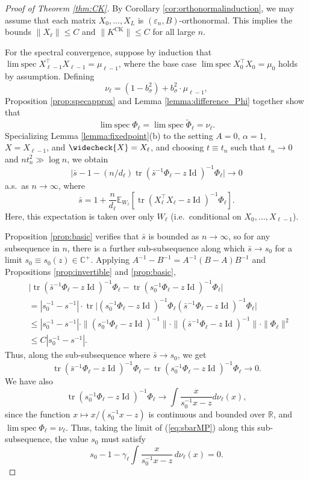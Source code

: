 \documentclass{article}
\theoremstyle{definition}
\newcommand{\R}{\mathbb{R}}
\newcommand{\C}{\mathbb{C}}
\newcommand{\E}{\mathbb{E}}
\newcommand{\Id}{\operatorname{Id}}
\newcommand{\CK}{\text{CK}}
\newcommand{\tr}{\operatorname{tr}}
\newcommand{\eps}{\varepsilon}
\newcommand{\vX}{\widecheck{X}}
\newcommand{\1}{\mathbf{1}}
\newcommand{\limspec}{\operatorname{lim\;spec}}
\begin{document}
\begin{proof}[Proof of Theorem \ref{thm:CK}]
By Corollary \ref{cor:orthonormalinduction},
we may assume that each matrix $X_0,\ldots,X_L$ is $(\eps_n,B)$-orthonormal.
This implies the bounds
$\|X_\ell\| \leq C$ and $\|K^\CK\| \leq C$ for all large $n$.

For the spectral convergence, suppose by induction that
$\limspec X_{\ell-1}^\top X_{\ell-1}=\mu_{\ell-1}$,
where the base case $\limspec X_0^\top X_0=\mu_0$ holds by assumption.
Defining
\[\nu_\ell=(1-b_\sigma^2)+b_\sigma^2 \cdot \mu_{\ell-1},\]
Proposition \ref{prop:specapprox} and Lemma \ref{lemma:difference_Phi}
together show that
\[\limspec \Phi_\ell=\limspec \tilde{\Phi}_\ell=\nu_\ell.\]
Specializing
Lemma \ref{lemma:fixedpoint}(b) to the setting $A=0$, $\alpha=1$,
$X=X_{\ell-1}$, and $\vX=X_\ell$,
and choosing $t \equiv t_n$ such that $t_n \to 0$ and
$nt_n^2 \gg \log n$, we obtain
\begin{equation}\label{eq:sbarMP}
\Big|\bar{s}-1-(n/d_\ell) \tr (\bar{s}^{-1}\Phi_\ell-z\Id)^{-1}\Phi_\ell\Big| \to 0
\end{equation}
a.s.\ as $n \to \infty$, where
\[\bar{s}=1+\frac{n}{d_\ell}
\E_{W_\ell}[\tr (X_\ell^\top X_\ell-z\Id)^{-1}\Phi_\ell].\]
Here, this expectation is taken over only $W_\ell$ (i.e.\ conditional on
$X_0,\ldots,X_{\ell-1}$).

Proposition \ref{prop:basic} verifies that $\bar{s}$
is bounded as $n \to \infty$,
so for any subsequence in $n$, there is a further
sub-subsequence along which $\bar{s} \to s_0$ for a limit $s_0 \equiv s_0(z)
\in \C^+$. Applying $A^{-1}-B^{-1}=A^{-1}(B-A)B^{-1}$ and Propositions
\ref{prop:invertible} and \ref{prop:basic},
\begin{align*}
&\Big|\tr (\bar{s}^{-1}\Phi_\ell-z\Id)^{-1}\Phi_\ell-
\tr (s_0^{-1}\Phi_\ell-z\Id)^{-1}\Phi_\ell\Big|\\
&=|s_0^{-1}-s^{-1}| \cdot \tr \Big|(s_0^{-1}\Phi_\ell-z\Id)^{-1}
\Phi_\ell (\bar{s}^{-1}\Phi_\ell-z\Id)^{-1}\Phi_\ell\Big|\\
&\leq |s_0^{-1}-s^{-1}| \cdot \|(s_0^{-1}\Phi_\ell-z\Id)^{-1}\| \cdot
\|(\bar{s}^{-1}\Phi_\ell-z\Id)^{-1}\|\cdot \|\Phi_\ell\|^2\\
&\leq C|s_0^{-1}-s^{-1}|.
\end{align*}
Thus, along the sub-subsequence where $\bar{s} \to s_0$, we get
\begin{equation}\label{eq:sbys0}
\tr (\bar{s}^{-1}\Phi_\ell-z\Id)^{-1}\Phi_\ell-
\tr (s_0^{-1}\Phi_\ell-z\Id)^{-1}\Phi_\ell \to 0.
\end{equation}
We have also
\begin{equation}\label{eq:Phibynu}
\tr (s_0^{-1}\Phi_\ell-z\Id)^{-1}\Phi_\ell \to
\int \frac{x}{s_0^{-1}x-z}d\nu_\ell(x),
\end{equation}
since the function $x \mapsto x/(s_0^{-1}x-z)$ is continuous and bounded over
$\R$, and $\limspec \Phi_\ell=\nu_\ell$. Thus, taking the limit of (\ref{eq:sbarMP})
along this sub-subsequence, the value $s_0$ must satisfy
\begin{equation}\label{eq:s0}
s_0-1-\gamma_\ell \int \frac{x}{s_0^{-1}x-z}\,d\nu_\ell(x)=0.
\end{equation}


\end{proof}
\end{document}
